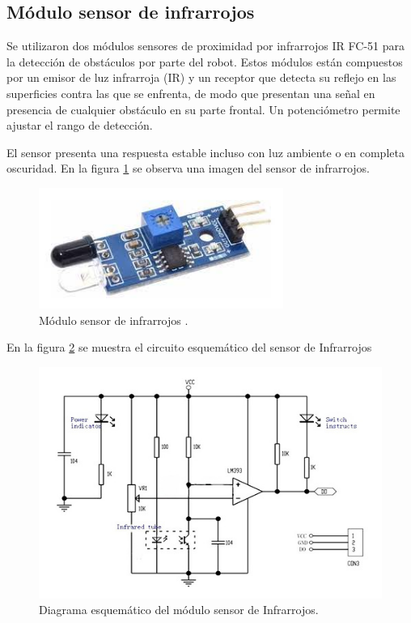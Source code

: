 \subsection{Módulo sensor de infrarrojos}

Se utilizaron dos módulos sensores de proximidad por infrarrojos IR FC-51 \citep{IR} para la detección de obstáculos por parte del robot. Estos módulos están compuestos por  un emisor de luz infrarroja (IR)  y un receptor que detecta su reflejo en  las superficies contra las que se enfrenta, de modo que presentan una señal en  presencia de cualquier obstáculo en su parte frontal. Un potenciómetro permite ajustar el rango de detección. 

El sensor presenta una respuesta estable incluso con luz ambiente o en completa oscuridad. En la figura \ref{fig:moduloIR} se observa una imagen del sensor de infrarrojos.

\begin{figure}[h]
	\centering
	\includegraphics[width=8cm]{./Figures/moduloIR.jpg}
	\caption{Módulo sensor de infrarrojos \protect\footnotemark.}
	\label{fig:moduloIR}
\end{figure}



En la figura \ref{fig:IRschem} se muestra el circuito esquemático del sensor de Infrarrojos

\begin{figure}[h]
	\centering
	\includegraphics[width=14cm]{./Figures/IRschem.jpg}
	\caption{Diagrama esquemático del módulo sensor de Infrarrojos\protect\footnotemark.}
	\label{fig:IRschem}
\end{figure}
\pagebreak

